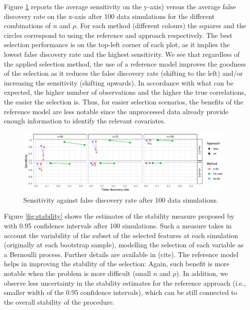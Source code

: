 \documentclass[american,]{article}
\theoremstyle{definition}
\begin{document}
Figure \ref{fig:sensitivity_vs_fdr} reports the average sensitivity on the y-axis) versus the average false discovery rate on the x-axis after 100 data simulations for the different combinations of $n$ and $\rho$. For each method (different colours) the squares and the circles correspond to using the reference and approach respectively. The best selection performance is on the top-left corner of each plot, as it implies the lowest false discovery rate and the highest sensitivity. We see that regardless of the applied selection method, the use of a reference model improves the goodness of the selection as it reduces the false discovery rate (shifting to the left) and/or increasing the sensitivity (shifting upwards). In accordance with what can be expected, the higher number of observations and the higher the true correlations, the easier the selection is. Thus, for easier selection scenarios, the benefits of the reference model are less notable since the unprocessed data already provide enough information to identify the relevant covariates.

\begin{figure}[tp]
  \centering
  \includegraphics[width=0.98\textwidth]{graphics/sensitivity_vs_fdr.pdf}
  \caption{Sensitivity against false discovery rate after 100 data simulations.\\}
  \label{fig:sensitivity_vs_fdr}
\end{figure}

Figure \ref{fig:stability} shows the estimates of the stability measure proposed by \cite{paper:stability} with 0.95 confidence intervals after 100 simulations. Such a measure takes in account the variability of the subset of the selected features at each simulation (originally at each bootstrap sample), modelling the selection of each variable as a Bernoulli process. Further details are available in (cite). The reference model helps in improving the stability of the selection: Again, such benefit is more notable when the problem is more difficult (small $n$ and $\rho$). In addition, we observe less uncertainty in the stability estimates for the reference approach (i.e., smaller width of the 0.95 confidence intervals), which can be still connected to the overall stability of the procedure.
\end{document}

